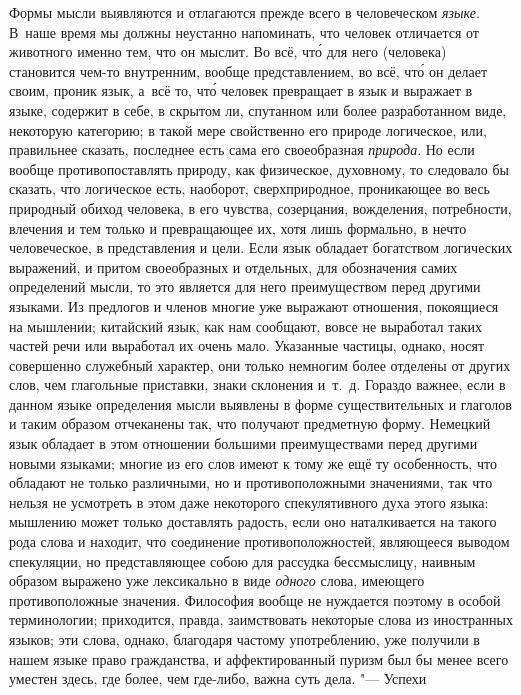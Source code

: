Формы мысли выявляются и отлагаются прежде всего в человеческом {\em языке}.
В~наше время мы должны неустанно напоминать, что человек отличается от
животного именно тем, что он мыслит. Во всё, чт\'{о} для него (человека)
становится чем-то внутренним, вообще представлением, во всё, чт\'{о} он делает
своим, проник язык, а~всё то, чт\'{о} человек превращает в язык и выражает в
языке, содержит в себе, в скрытом ли, спутанном или более разработанном виде,
некоторую категорию; в такой мере свойственно его природе логическое, или,
правильнее сказать, последнее есть сама его своеобразная {\em природа}. Но если
вообще противопоставлять природу, как физическое, духовному, то следовало бы
сказать, что логическое есть, наоборот, сверхприродное, проникающее во весь
природный обиход человека, в его чувства, созерцания, вожделения, потребности,
влечения и тем только и превращающее их, хотя лишь формально, в нечто
человеческое, в представления и цели. Если язык обладает богатством логических
выражений, и притом своеобразных и отдельных, для обозначения самих определений
мысли, то это является для него преимуществом перед другими языками. Из
предлогов и членов многие уже выражают отношения, покоящиеся на мышлении;
китайский язык, как нам сообщают, вовсе не выработал таких частей речи или
выработал их очень мало. Указанные частицы, однако, носят совершенно служебный
характер, они только немногим более отделены от других слов, чем глагольные
приставки, знаки склонения и~т.~д. Гораздо важнее, если в данном языке
определения мысли выявлены в форме существительных и глаголов и таким образом
отчеканены так, что получают предметную форму. Немецкий язык обладает в этом
отношении большими преимуществами перед другими новыми языками; многие из его
слов имеют к тому же ещё ту особенность, что обладают не только различными, но
и противоположными значениями, так что нельзя не усмотреть в этом даже
некоторого спекулятивного духа этого языка: мышлению может только доставлять
радость, если оно наталкивается на такого рода слова и находит, что соединение
противоположностей, являющееся выводом спекуляции, но представляющее собою для
рассудка бессмыслицу, наивным образом выражено уже лексикально в виде {\em
одного} слова, имеющего противоположные значения. Философия вообще не нуждается
поэтому в особой терминологии; приходится, правда, заимствовать некоторые слова
из иностранных языков; эти слова, однако, благодаря частому употреблению, уже
получили в нашем языке право гражданства, и аффектированный пуризм был бы менее
всего уместен здесь, где более, чем где-либо, важна суть дела. "--- Успехи

